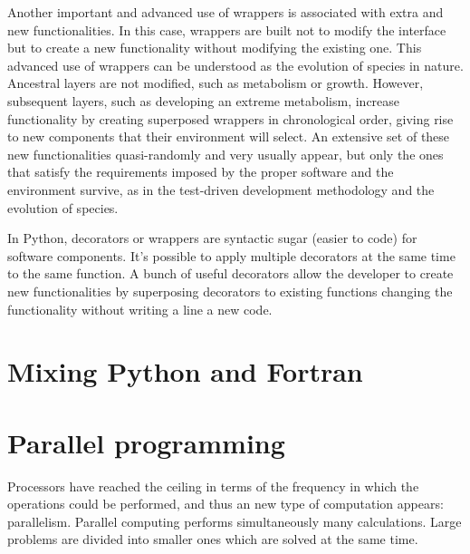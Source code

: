 
Another important and advanced use of wrappers is associated with extra and new functionalities. 
In this case, wrappers are built not to 
modify the interface  but to create a new functionality without modifying the existing one. This advanced 
use of wrappers can be understood as the evolution of species in nature. 
Ancestral layers are not modified, such as metabolism or growth. However, subsequent layers, 
such as developing an extreme metabolism,  increase functionality by creating superposed 
wrappers in chronological order, giving rise to new components that their 
environment will select. 
An extensive set of these new functionalities quasi-randomly and very usually appear, 
but only the ones that satisfy 
the requirements imposed by the proper software and the environment survive, 
as in the test-driven development methodology and the evolution of 
species.





In Python, decorators or wrappers are syntactic sugar (easier to code) for software components. 
It's possible to apply multiple decorators at the same time to the same function. 
A bunch of useful decorators allow the developer to create new functionalities by superposing 
decorators to existing functions changing the functionality 
without writing a line a new code. 





\newpage 
\section{Mixing Python and Fortran}

\newpage 
\section{Parallel programming} 
Processors have reached the ceiling in terms of the frequency in which the operations 
could be performed, and thus an new type of computation appears: parallelism.  
Parallel computing performs simultaneously many calculations. 
Large problems are divided into smaller ones which are solved at the same time.


